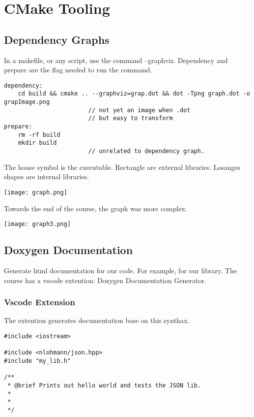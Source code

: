 \chapter{CMake Tooling}

\section{Dependency Graphs}

In a makefile, or any script, use the command --graphviz. Dependency and prepare are the flag needed to run the command.

\begin{verbatim}
dependency:
    cd build && cmake .. --graphviz=grap.dot && dot -Tpng graph.dot -o grapImage.png
                        // not yet an image when .dot
                        // but easy to transform
prepare:
    rm -rf build
    mkdir build
                        // unrelated to dependency graph.
\end{verbatim}

The house symbol is the executable. Rectangle are external libraries. Losanges shapes are internal libraries.

\begin{center}
    \texttt{[image: graph.png]}
\end{center}

Towards the end of the course, the graph was more complex.

\begin{center}
    \texttt{[image: graph3.png]}
\end{center}



\section{Doxygen Documentation}

Generate html documentation for our code. For example, for our library. The course has a vscode extention: Doxygen Documentation Generator.

\subsection{Vscode Extension}

The extention generates documentation base on this synthax.

\begin{verbatim}
#include <iostream>

#include <nlohmann/json.hpp>
#include "my_lib.h"

/**
 * @brief Prints out hello world and tests the JSON lib.
 *
 *
 */
\end{verbatim}

